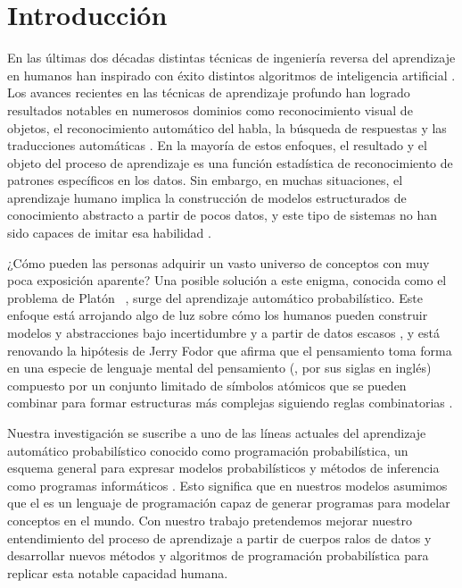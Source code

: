 




\chapter{Introducción}
\label{intro}

En las últimas dos décadas distintas técnicas de ingeniería reversa del aprendizaje en humanos han inspirado con éxito distintos algoritmos de inteligencia artificial \cite{russell2002artificial}. Los avances recientes en las técnicas de aprendizaje profundo han logrado resultados notables en numerosos dominios como reconocimiento visual de objetos, el reconocimiento automático del habla, la búsqueda de respuestas y las traducciones automáticas \cite{lecun2015deep}. En la mayoría de estos enfoques, el resultado y el objeto del proceso de aprendizaje es una función estadística de reconocimiento de patrones específicos en los datos. Sin embargo, en muchas situaciones, el aprendizaje humano implica la construcción de modelos estructurados de conocimiento abstracto a partir de pocos datos, y este tipo de sistemas no han sido capaces de imitar esa habilidad \cite{lake2017building}.

¿Cómo pueden las personas adquirir un vasto universo de conceptos con muy poca exposición aparente? Una posible solución a este enigma, conocida como el problema de Platón ~\cite{chomsky1986knowledge, chomsky2006cognitive}, surge del aprendizaje automático probabilístico. Este enfoque está arrojando algo de luz sobre cómo los humanos pueden construir modelos y abstracciones bajo incertidumbre y a partir de datos escasos \cite{tenenbaum2011grow,ghahramani2015probabilistic}, y está renovando la hipótesis de Jerry Fodor que afirma que el pensamiento toma forma en una especie de lenguaje mental del pensamiento (\lot, por sus siglas en inglés) compuesto por un conjunto limitado de símbolos atómicos que se pueden combinar para formar estructuras más complejas siguiendo reglas combinatorias \cite{fodor1975language}.

Nuestra investigación se suscribe a uno de las líneas actuales del aprendizaje automático probabilístico conocido como programación probabilística, un esquema general para expresar modelos probabilísticos y métodos de inferencia como programas informáticos \cite{ghahramani2015probabilistic}. Esto significa que en nuestros modelos asumimos que el \lot es un lenguaje de programación capaz de generar programas para modelar conceptos en el mundo. Con nuestro trabajo pretendemos mejorar nuestro entendimiento del proceso de aprendizaje a partir de cuerpos ralos de datos y desarrollar nuevos métodos y algoritmos de programación probabilística para replicar esta notable capacidad humana. 


